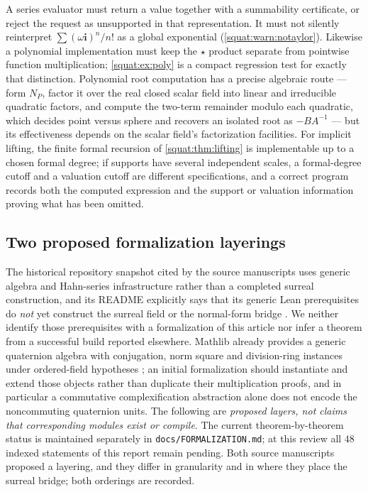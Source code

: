 \documentclass[11pt,letterpaper]{article}
\numberwithin{equation}{section}
\theoremstyle{definition}
\theoremstyle{remark}
\newcommand{\ii}{\mathbf i}
\begin{document}
A series evaluator must return a value together with a summability certificate, or reject
the request as unsupported in that representation. It must not silently reinterpret
$\sum(\omega\ii)^n/n!$ as a global exponential (\cref{squat:warn:notaylor}). Likewise a
polynomial implementation must keep the $\star$ product separate from pointwise function
multiplication; \cref{squat:ex:poly} is a compact regression test for exactly that
distinction. Polynomial root computation has a precise algebraic route --- form $N_P$,
factor it over the real closed scalar field into linear and irreducible quadratic factors,
and compute the two-term remainder modulo each quadratic, which decides point versus
sphere and recovers an isolated root as $-BA^{-1}$ --- but its effectiveness depends on the
scalar field's factorization facilities. For implicit lifting, the finite formal recursion
of \cref{squat:thm:lifting} is implementable up to a chosen formal degree; if supports have
several independent scales, a formal-degree cutoff and a valuation cutoff are different
specifications, and a correct program records both the computed expression and the support
or valuation information proving what has been omitted.

\subsection{Two proposed formalization layerings}\label{squat:sub:lean}
The historical repository snapshot cited by the source manuscripts uses generic algebra
and Hahn-series infrastructure rather than a
completed surreal construction, and its README explicitly says that its generic Lean
prerequisites do \emph{not} yet construct the surreal field or the normal-form bridge
\cite{Repo}. We neither identify those prerequisites with a formalization of this article
nor infer a theorem from a successful build reported elsewhere. Mathlib already provides a
generic quaternion algebra with conjugation, norm square and division-ring instances under
ordered-field hypotheses \cite{Mathlib}; an initial formalization should instantiate and
extend those objects rather than duplicate their multiplication proofs, and in particular a
commutative complexification abstraction alone does not encode the noncommuting quaternion
units. The following are \emph{proposed layers, not claims that corresponding modules
exist or compile}. The current theorem-by-theorem status is maintained separately in
\texttt{docs/FORMALIZATION.md}; at this review all $48$ indexed statements of this
report remain pending. Both source manuscripts proposed a layering, and they differ in
granularity and in where they place the surreal bridge; both orderings are recorded.
\end{document}

